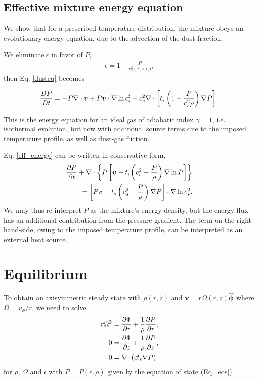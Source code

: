 \subsection{Effective mixture energy equation}
We show that for a prescribed temperature distribution, the mixture
obeys an evolutionary energy equation, due to the advection of the
dust-fraction. 

We eliminate $\epsilon$ in favor of $P$, 
\begin{align}
  \epsilon = 1 - \frac{P}{c_s^2(r,z)\rho}, 
\end{align}
then Eq. \ref{dusteq} becomes

\begin{align}
\frac{DP}{Dt} = - P \nabla\cdot\bm{v} + P\bm{v}\cdot\nabla\ln{c_s^2} +
c_s^2 \nabla\cdot\left[t_\mathrm{s}\left(1 - \frac{P}{c_s^2\rho}\right)\nabla
  P\right]. \label{eff_energy}
\end{align}

This is the energy equation for an ideal gas of adiabatic index
$\gamma=1$, i.e. isothermal evolution, but now with additional source 
terms due to the imposed temperature profile, as well as dust-gas
friction.   

Eq. \ref{eff_energy} can be written in conservative form,
\begin{align*}
  \frac{\partial P}{ \partial t} + \nabla\cdot\left\{P\left[\bm{v} -
      t_\mathrm{s}\left(c_s^2 - \frac{P}{\rho}\right)\nabla\ln{P}\right]
    \right\}\\
  = \left[P\bm{v} - t_\mathrm{s}\left(c_s^2 - \frac{P}{\rho}\right)\nabla
    P\right]\cdot\nabla\ln{c_s^2}. 
\end{align*}
We may thus re-interpret $P$ as the mixture's energy density, but the
energy flux has an additional contribution from the pressure
gradient. The term on the right-hand-side, owing to the imposed
temperature profile, can be interpreted as an external heat source. 

\section{Equilibrium}
To obtain an axisymmetric steady state with $\rho(r,z)$ and 
$\bm{v}=r\Omega(r,z)\hat{\bm{\phi}}$ where $\Omega = v_\phi/r$, 
we need to solve 
\begin{align}
  r\Omega^2 &= \frac{\partial \Phi}{\partial r} + \frac{1}{\rho}\frac{\partial P}{\partial
    r},\label{steady_momr}\\
  0 & = \frac{\partial\Phi}{\partial z} + \frac{1}{\rho}\frac{\partial P}{\partial z},\label{steady_momz}\\
  0 & = \nabla\cdot\left(\epsilon t_\mathrm{s}\nabla P\right) \label{steady_dust}
\end{align}
for $\rho$, $\Omega$ and $\epsilon$ with $P=P(\epsilon,\rho)$ given by
the equation of state (Eq. \ref{eos}). 

